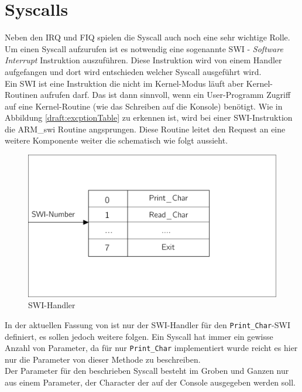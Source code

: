 \section{Syscalls}
Neben den IRQ und FIQ spielen die Syscall auch noch eine sehr wichtige Rolle. Um einen Syscall aufzurufen ist es notwendig eine sogenannte SWI - \textit{Software Interrupt} Instruktion auszuf\"uhren. Diese Instruktion wird von einem Handler aufgefangen und dort wird entschieden welcher Syscall ausgef\"uhrt wird.\\
Ein SWI ist eine Instruktion die nicht im Kernel-Modus l\"auft aber Kernel-Routinen aufrufen darf. Das ist dann sinnvoll, wenn ein User-Programm Zugriff auf eine Kernel-Routine (wie das Schreiben auf die Konsole) ben\"otigt. Wie in Abbildung \ref{draft:excptionTable} zu erkennen ist, wird bei einer SWI-Instruktion die ARM\_swi Routine angsprungen. Diese Routine leitet den Request an eine weitere Komponente weiter die schematisch wie folgt aussieht.
\begin{figure}[H]
	\begin{center}	
	\caption{SWI-Handler}
	\includegraphics[scale=0.60]{common/swihandler.pdf}
	\end{center}
\end{figure}
\noindent
In der aktuellen Fassung von \mops ist nur der SWI-Handler f\"ur den \texttt{Print\_Char}-SWI definiert, es sollen jedoch weitere folgen. Ein Syscall hat immer ein gewisse Anzahl von Parameter, da f\"ur \mops nur \texttt{Print\_Char} implementiert wurde reicht es hier nur die Parameter von dieser Methode zu beschreiben.\\ 
Der Parameter f\"ur den beschrieben Syscall besteht im Groben und Ganzen nur aus einem Parameter, der Character der auf der Console ausgegeben werden soll.
